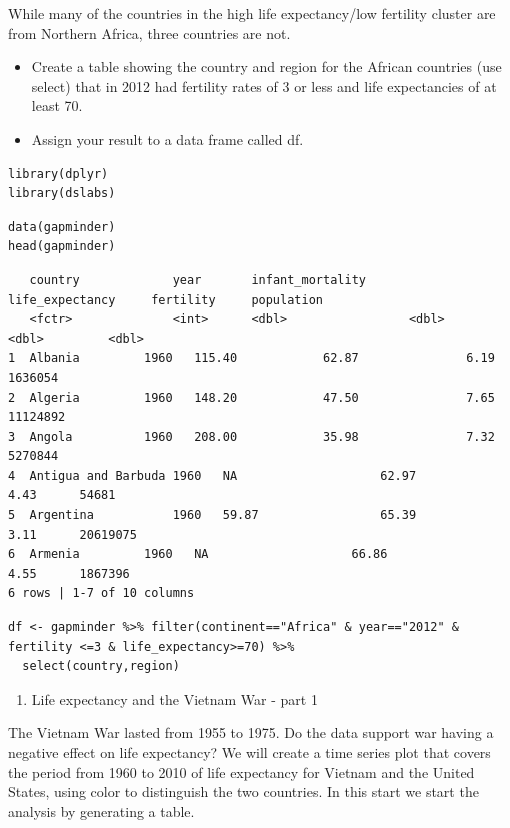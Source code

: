\documentclass[
]{article}
\providecommand{\tightlist}{%
  \setlength{\itemsep}{0pt}\setlength{\parskip}{0pt}}
\begin{document}
While many of the countries in the high life expectancy/low fertility
cluster are from Northern Africa, three countries are not.

\begin{itemize}
\tightlist
\item
  Create a table showing the country and region for the African
  countries (use select) that in 2012 had fertility rates of 3 or less
  and life expectancies of at least 70.
\item
  Assign your result to a data frame called df.
\end{itemize}

\begin{verbatim}
library(dplyr)
library(dslabs)
\end{verbatim}

\begin{verbatim}
data(gapminder)
head(gapminder)
\end{verbatim}

\begin{verbatim}
   country             year       infant_mortality      life_expectancy     fertility     population
   <fctr>              <int>      <dbl>                 <dbl>               <dbl>         <dbl>
1  Albania         1960   115.40            62.87               6.19      1636054   
2  Algeria         1960   148.20            47.50               7.65      11124892  
3  Angola          1960   208.00            35.98               7.32      5270844   
4  Antigua and Barbuda 1960   NA                    62.97               4.43      54681 
5  Argentina           1960   59.87                 65.39               3.11      20619075  
6  Armenia         1960   NA                    66.86               4.55      1867396   
6 rows | 1-7 of 10 columns
\end{verbatim}

\begin{verbatim}
df <- gapminder %>% filter(continent=="Africa" & year=="2012" & fertility <=3 & life_expectancy>=70) %>%
  select(country,region)
\end{verbatim}

\begin{enumerate}
\def\labelenumi{\arabic{enumi}.}
\setcounter{enumi}{3}
\tightlist
\item
  Life expectancy and the Vietnam War - part 1
\end{enumerate}

The Vietnam War lasted from 1955 to 1975. Do the data support war having
a negative effect on life expectancy? We will create a time series plot
that covers the period from 1960 to 2010 of life expectancy for Vietnam
and the United States, using color to distinguish the two countries. In
this start we start the analysis by generating a table.
\end{document}

